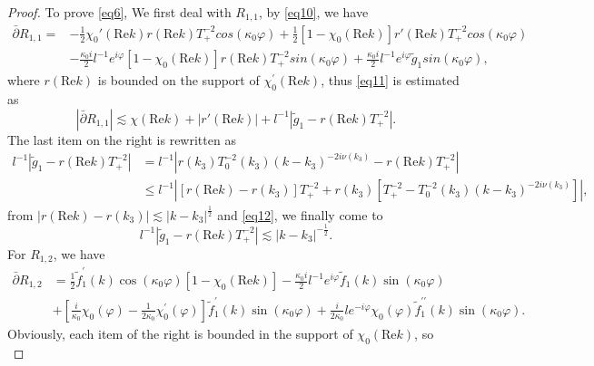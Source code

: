 \documentclass[11pt]{article}
\numberwithin{equation}{section}
\begin{document}
\begin{proof}
To prove \eqref{eq6}, We first deal with $R_{1,1}$, by \eqref{eq10}, we have
\begin{equation}
\begin{aligned}\label{eq11}
\bar{\partial}R_{1,1}=&-\frac{1}{2}\chi_0'(\mathrm{Re}k)r(\mathrm{Re}k)T_+^{-2}cos(\kappa_0\varphi)+\frac{1}{2}[1-\chi_0(\mathrm{Re}k)]r'(\mathrm{Re}k)T_+^{-2}cos(\kappa_0\varphi)\\
&-\frac{\kappa_0i}{2}l^{-1}e^{i\varphi}[1-\chi_0(\mathrm{Re}k)]r(\mathrm{Re}k)T_+^{-2}sin(\kappa_0\varphi)+\frac{\kappa_0i}{2}l^{-1}e^{i\varphi}\tilde{g}_{1}sin(\kappa_0\varphi),
\end{aligned}
\end{equation}
where $r(\mathrm{Re}k)$ is bounded on the support of $\chi_0^{\prime}(\mathrm{Re}k)$, thus \eqref{eq11} is estimated as
\begin{equation}
\left|\bar{\partial}R_{1,1}\right|\lesssim\chi(\mathrm{Re}k)+\left|r'(\mathrm{Re}k)\right|+l^{-1}\left|\tilde{g}_{1}-r(\mathrm{Re}k)T_+^{-2}\right|.
\end{equation}
The last item on the right is rewritten as
\begin{align*}
    l^{-1}\left|\tilde g_1-r(\mathrm{Re}k)T_+^{-2}\right|&=l^{-1}\left|r(k_3)T_0^{-2}(k_3)(k-k_3)^{-2i\nu(k_3)}-r(\mathrm{Re}k)T_+^{-2}\right|\\
    &\leqslant l^{-1}\left|\left[r(\mathrm{Re}k)-r(k_3)\right]T_+^{-2}+r(k_3)\left[T_+^{-2}-T_0^{-2}(k_3)(k-k_3)^{-2i\nu(k_3)}\right]\right|,
\end{align*}
from $|r(\mathrm{Re}k)-r(k_3)|\lesssim|k-k_3|^{\frac{1}{2}}$ and \eqref{eq12}, we finally come to
\begin{equation}
    l^{-1}|\tilde{g}_{1}-r(\mathrm{Re}k)T_+^{-2}|\lesssim|k-k_3|^{-\frac{1}{2}}.
\end{equation}
For $R_{1,2}$, we have
\begin{align}
    \bar{\partial }R_{1,2}&= \frac{1}{2}\tilde{f}_1^\prime(k)\cos(\kappa_0\varphi)\left[1-\chi_0(\mathrm{Re}k)\right]
    -\frac{\kappa_0i}{2}l^{-1}e^{i\varphi}\tilde{f}_1(k)\sin(\kappa_0\varphi)\\
    &+\left[\frac{i}{\kappa_0}\chi_0(\varphi)-\frac{1}{2\kappa_0}\chi_0^\prime(\varphi)\right]\tilde{f}_1^\prime(k)\sin(\kappa_0\varphi)+\frac{i}{2\kappa_0}le^{-i\varphi}\chi_0(\varphi)\tilde{f}_1^{\prime\prime}(k)\sin(\kappa_0\varphi).
\end{align}
Obviously, each item of the right is bounded in the support of $\chi_0(\mathrm{Re}k)$, so
\begin{equation}

\end{equation}
\end{proof}
\end{document}
